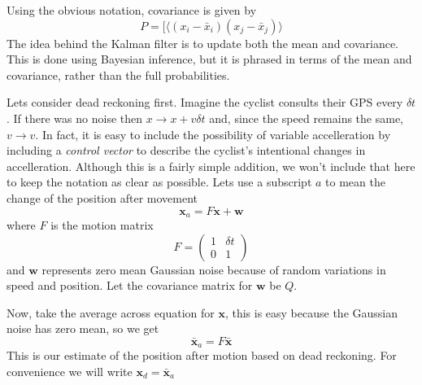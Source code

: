 \documentclass[12pt]{article}
\begin{document}
Using the obvious notation, covariance is given by
\begin{equation}
P=[\langle (x_i-\bar{x}_i)(x_j-\bar{x}_j)\rangle
\end{equation}
The idea behind the Kalman filter is to update both the mean and
covariance. This is done using Bayesian inference, but it is phrased
in terms of the mean and covariance, rather than the full
probabilities.

Lets consider dead reckoning first. Imagine the cyclist consults their
GPS every $\delta t$. If there was no noise then $x\rightarrow
x+v\delta t$ and, since the speed remains the same, 
$v\rightarrow v$. 
In fact, it is easy to include the possibility of variable
accelleration by including a \textsl{control vector} to describe the
cyclist's intentional changes in accelleration. Although this is a
fairly simple addition, we won't include that here to keep the
notation as clear as possible. Lets use a subscript $a$ to mean the
change of the position after movement
\begin{equation}
\textbf{x}_a=F\textbf{x}+\textbf{w}
\end{equation}
where $F$ is the motion matrix
\begin{equation}
F=\left(\begin{array}{cc}1&\delta t\\0&1\end{array}\right)
\end{equation}
and $\mathbf{w}$ represents zero mean Gaussian noise because of random
variations in speed and position. Let the covariance matrix for
$\mathbf{w}$ be $Q$.

Now, take the average across equation for $\mathbf{x}$, this is easy
because the Gaussian noise has zero mean, so we get
\begin{equation}
\mathbf{\bar{x}}_a=F\mathbf{\bar{x}}
\end{equation}
This is our estimate of the position after motion based on dead reckoning. For convenience we will write $\mathbf{x}_d=\mathbf{\bar{x}}_a$
\end{document}
